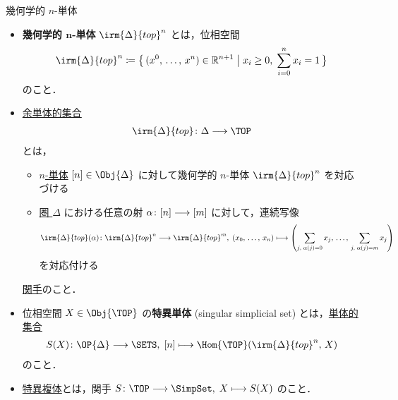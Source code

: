 \documentclass[TQFT_main]{subfiles}
\begin{document}
\begin{mydef}[label=def:simplicial-top,breakable]{幾何学的 $n$-単体}
    \begin{itemize}
        \item \textbf{幾何学的 $\bm{n}$-単体} $\irm{\Delta}{top}^n$ とは，位相空間
        \begin{align}
            \irm{\Delta}{top}^n \coloneqq \bigl\{\, (x^0,\, \dots,\, x^n) \in \mathbb{R}^{n+1}\bigm| x_i \ge 0,\; \sum_{i=0}^n x_i = 1 \,\bigr\} 
        \end{align}
        のこと．
        \item \hyperref[def:SimpSet]{余単体的集合} 
        \begin{align}
            \irm{\Delta}{top} \colon \Delta \lto \TOP
        \end{align}
        とは，
        \begin{itemize}
            \item \hyperref[def:simplex-cat]{$n$-単体} $[n] \in \Obj{\Delta}$ に対して幾何学的 $n$-単体 $\irm{\Delta}{top}^n$ を対応づける
            \item \hyperref[def:simplex-cat]{圏 $\Delta$} における任意の射 $\alpha \colon [n] \longrightarrow [m]$ に対して，連続写像
            \begin{align}
                \irm{\Delta}{top}(\alpha) \colon \irm{\Delta}{top}^n \lto \irm{\Delta}{top}^m,\; (x_0,\, \dots,\, x_n) \lmto \left( \sum_{j,\; \alpha(j) = 0} x_j,\, \dots ,\, \sum_{j,\; \alpha(j) = m} x_j \right) 
            \end{align}
            を対応付ける
        \end{itemize}
        \hyperref[def:functor]{関手}のこと．
        \item 位相空間 $X \in \Obj{\TOP}$ の\textbf{特異単体} (singular simplicial set) とは，\hyperref[def:SimpSet]{単体的集合}
        \begin{align}
            S(X) \colon \OP{\Delta} \lto \SETS,\; [n] \lmto \Hom{\TOP} (\irm{\Delta}{top}^n ,\, X)
        \end{align}
        のこと．
        \item \hyperref[def:simplicial-top]{特異複体}とは，関手 $S \colon \TOP \lto \SimpSet,\; X \lmto S(X)$ のこと．
    \end{itemize}
    
\end{mydef}
\end{document}
